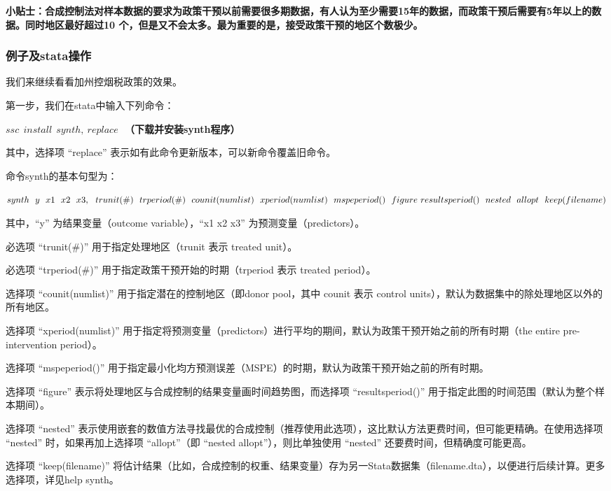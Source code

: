 \documentclass[cn,10pt,math=newtx,citestyle=gb7714-2015,bibstyle=gb7714-2015]{elegantbook}
\begin{document}
	\textbf{小贴士：合成控制法对样本数据的要求为政策干预以前需要很多期数据，有人认为至少需要15年的数据，而政策干预后需要有5年以上的数据。同时地区最好超过10 个，但是又不会太多。最为重要的是，接受政策干预的地区个数极少。}
	
	\subsubsection{例子及stata操作}
	
	我们来继续看看加州控烟税政策的效果。
	
	第一步，我们在stata中输入下列命令：
	
	\textbf{$ssc~~install~~synth,~replace~~~$（下载并安装synth程序）}
	
	其中，选择项 “replace” 表示如有此命令更新版本，可以新命令覆盖旧命令。
	
	命令synth的基本句型为：
	
	\textbf{$synth~~y~~x1~~x2~~x3 ,~~trunit(\#)~~trperiod(\#)~~counit(numlist)~~xperiod(numlist)~~mspeperiod()~~figure~~\\
		resultsperiod()~~nested~~allopt~~keep(filename)$}
	
	其中，“y” 为结果变量（outcome variable），“x1 x2 x3” 为预测变量（predictors）。
	
	必选项 “trunit(\#)” 用于指定处理地区（trunit 表示 treated unit）。
	
	必选项 “trperiod(\#)” 用于指定政策干预开始的时期（trperiod 表示 treated period）。
	
	选择项 “counit(numlist)” 用于指定潜在的控制地区（即donor pool，其中 counit 表示 control units），默认为数据集中的除处理地区以外的所有地区。
	
	选择项 “xperiod(numlist)” 用于指定将预测变量（predictors）进行平均的期间，默认为政策干预开始之前的所有时期（the entire pre-intervention period）。
	
	选择项 “mspeperiod()” 用于指定最小化均方预测误差（MSPE）的时期，默认为政策干预开始之前的所有时期。
	
	选择项 “figure” 表示将处理地区与合成控制的结果变量画时间趋势图，而选择项 “resultsperiod()” 用于指定此图的时间范围（默认为整个样本期间）。
	
	选择项 “nested” 表示使用嵌套的数值方法寻找最优的合成控制（推荐使用此选项），这比默认方法更费时间，但可能更精确。在使用选择项 “nested” 时，如果再加上选择项 “allopt”（即 “nested allopt”），则比单独使用 “nested” 还要费时间，但精确度可能更高。
	
	选择项 “keep(filename)” 将估计结果（比如，合成控制的权重、结果变量）存为另一Stata数据集（filename.dta），以便进行后续计算。更多选择项，详见help synth。
	
\end{document}
